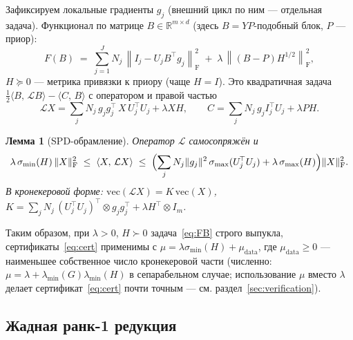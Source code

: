 \documentclass[11pt,a4paper]{article}
\newcommand{\R}{\mathbb{R}}
\newcommand{\Id}{I}
\newcommand{\T}{^{\!\top}}
\newcommand{\F}{\mathrm{F}}
\newcommand{\ip}[2]{\langle #1,\,#2\rangle}
\newcommand{\Lop}{\mathcal{L}}
\newcommand{\erm}[1]{\left\|#1\right\|_{\F}}
\theoremstyle{plain}
\newtheorem{lemma}[theorem]{Лемма}
\theoremstyle{definition}
\theoremstyle{remark}
\begin{document}
Зафиксируем локальные градиенты $g_j$ (внешний цикл по ним --- отдельная
задача). Функционал по матрице $B\in\R^{m\times d}$ (здесь $B=YP$-подобный
блок, $P$ --- приор):
\begin{equation}\label{eq:FB}
F(B)\;=\;\sum_{j=1}^{J} N_j\,\erm{I_j-U_jB\T g_j}^2
\;+\;\lambda\,\erm{(B-P)H^{1/2}}^2,
\end{equation}
$H\succeq 0$ --- метрика привязки к приору (чаще $H=\Id$). Это квадратичная
задача $\tfrac12\ip{B}{\Lop B}-\ip{C}{B}$ с оператором и правой частью
\begin{equation}\label{eq:Lop}
\Lop X=\sum_{j}N_j\,g_jg_j\T\,X\,U_j\T U_j+\lambda XH,
\qquad
C=\sum_{j}N_j\,g_j I_j\T U_j+\lambda P H .
\end{equation}

\begin{lemma}[SPD-обрамление]\label{lem:spd}
Оператор $\Lop$ самосопряжён и
\begin{equation}\label{eq:spd-bounds}
\lambda\,\sigma_{\min}(H)\,\|X\|_{\F}^2
\;\le\;\ip{X}{\Lop X}\;\le\;
\Bigl(\sum_j N_j\|g_j\|^2\,\sigma_{\max}(U_j\T U_j)+\lambda\,\sigma_{\max}(H)\Bigr)\|X\|_{\F}^2 .
\end{equation}
В кронекеровой форме: $\mathrm{vec}(\Lop X)=K\,\mathrm{vec}(X)$,
$K=\sum_j N_j\,(U_j\T U_j)\T\!\otimes g_jg_j\T+\lambda H\T\!\otimes\Id_m$.
\end{lemma}

Таким образом, при $\lambda>0$, $H\succ0$ задача~\eqref{eq:FB} строго выпукла,
сертификаты~\eqref{eq:cert} применимы с
$\mu=\lambda\sigma_{\min}(H)+\mu_{\mathrm{data}}$, где
$\mu_{\mathrm{data}}\ge 0$ --- наименьшее собственное число кронекеровой части
(численно: $\mu=\lambda+\lambda_{\min}(G)\lambda_{\min}(H)$ в сепарабельном случае;
использование $\mu$ вместо $\lambda$ делает сертификат~\eqref{eq:cert} почти
точным --- см. раздел~\ref{sec:verification}).

\subsection{Жадная ранк-1 редукция}
\end{document}
